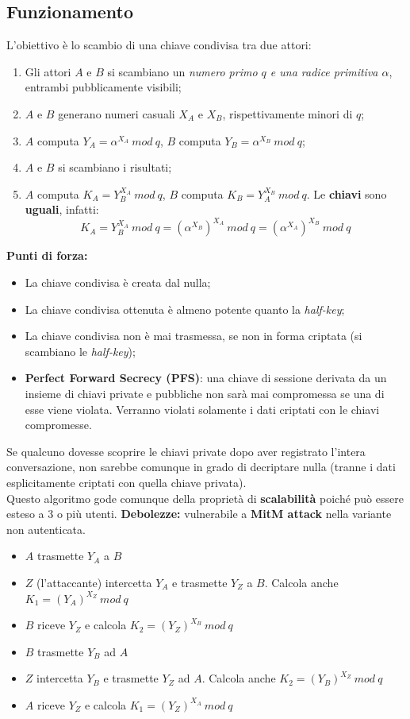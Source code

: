 \documentclass[11pt, a4paper, twoside, italian]{report}
\theoremstyle{plain}
\begin{document}
\subsection*{Funzionamento}
L'obiettivo è lo scambio di una chiave condivisa tra due attori:
\begin{enumerate}
	\item Gli attori $A$ e $B$ si scambiano un \textit{numero primo $q$ e una radice primitiva $\alpha$}, entrambi pubblicamente visibili;
	\item $A$ e $B$ generano numeri casuali $X_{A}$ e $X_{B}$, rispettivamente minori di $q$;
	\item $A$ computa $Y_{A} = \alpha^{X_{A}}\ mod\ q$, $B$ computa $Y_{B} = \alpha^{X_{B}}\ mod\ q$;
	\item $A$ e $B$ si scambiano i risultati;
	\item $A$ computa $K_{A} = Y^{X_{A}}_{B}\ mod\ q$, $B$ computa $K_{B} = Y^{X_{B}}_{A}\ mod\ q$. Le \textbf{chiavi} sono \textbf{uguali}, infatti: \[ K_{A} = Y^{X_{A}}_{B}\ mod\ q = (\alpha^{X_{B}})^{X_{A}}\ mod\ q = (\alpha^{X_{A}})^{X_{B}}\ mod\ q \]
\end{enumerate}
\noindent
\textbf{Punti di forza:}
\begin{itemize}
	\item La chiave condivisa è creata dal nulla;
	\item La chiave condivisa ottenuta è almeno potente quanto la \textit{half-key};
	\item La chiave condivisa non è mai trasmessa, se non in forma criptata (si scambiano le \textit{half-key});
	\item \textbf{Perfect Forward Secrecy (PFS)}: una chiave di sessione derivata da un insieme di chiavi private e pubbliche non sarà mai compromessa se una di esse viene violata. Verranno violati solamente i dati criptati con le chiavi compromesse.
\end{itemize}
\noindent
Se qualcuno dovesse scoprire le chiavi private dopo aver registrato l'intera conversazione, non sarebbe comunque in grado di decriptare nulla (tranne i dati esplicitamente criptati con quella chiave privata).\\
Questo algoritmo gode comunque della proprietà di \textbf{scalabilità} poiché può essere esteso a 3 o più utenti.
\newpage
\noindent
\textbf{Debolezze:}
vulnerabile a \textbf{MitM attack} nella variante non autenticata.
\begin{itemize}
	\item $A$ trasmette $Y_{A}$ a $B$
	\item $Z$ (l'attaccante) intercetta $Y_{A}$ e trasmette $Y_{Z}$ a $B$. Calcola anche $K_{1} = (Y_{A})^{X_{Z}}\ mod\ q$
	\item $B$ riceve $Y_{Z}$ e calcola $K_{2} = (Y_{Z})^{X_{B}}\ mod\ q$
	\item $B$ trasmette $Y_{B}$ ad $A$
	\item $Z$ intercetta $Y_{B}$ e trasmette $Y_{Z}$ ad $A$. Calcola anche $K_{2} = (Y_{B})^{X_{Z}}\ mod\ q$
	\item $A$ riceve $Y_{Z}$ e calcola $K_{1} = (Y_{Z})^{X_{A}}\ mod\ q$
\end{itemize}
\end{document}
